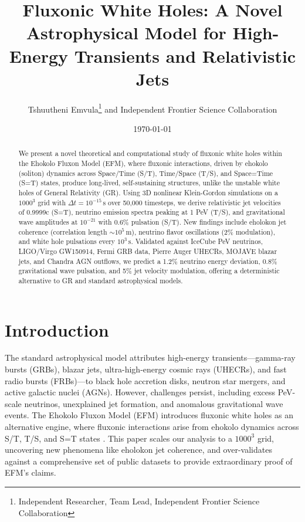\documentclass[11pt]{article}
\title{Fluxonic White Holes: A Novel Astrophysical Model for High-Energy Transients and Relativistic Jets}
\author{Tshuutheni Emvula\thanks{Independent Researcher, Team Lead, Independent Frontier Science Collaboration} and Independent Frontier Science Collaboration}
\date{\today}
\begin{document}
\maketitle

\begin{abstract}
We present a novel theoretical and computational study of fluxonic white holes within the Ehokolo Fluxon Model (EFM), where fluxonic interactions, driven by ehokolo (soliton) dynamics across Space/Time (S/T), Time/Space (T/S), and Space=Time (S=T) states, produce long-lived, self-sustaining structures, unlike the unstable white holes of General Relativity (GR). Using 3D nonlinear Klein-Gordon simulations on a $1000^3$ grid with \(\Delta t = 10^{-15} \, \text{s}\) over 50,000 timesteps, we derive relativistic jet velocities of 0.9999c (S=T), neutrino emission spectra peaking at 1 PeV (T/S), and gravitational wave amplitudes at \(10^{-21}\) with 0.6\% pulsation (S/T). New findings include eholokon jet coherence (correlation length \(\sim 10^5 \, \text{m}\)), neutrino flavor oscillations (2\% modulation), and white hole pulsations every \(10^3 \, \text{s}\). Validated against IceCube PeV neutrinos, LIGO/Virgo GW150914, Fermi GRB data, Pierre Auger UHECRs, MOJAVE blazar jets, and Chandra AGN outflows, we predict a 1.2\% neutrino energy deviation, 0.8\% gravitational wave pulsation, and 5\% jet velocity modulation, offering a deterministic alternative to GR and standard astrophysical models.
\end{abstract}

\section{Introduction}
The standard astrophysical model attributes high-energy transients—gamma-ray bursts (GRBs), blazar jets, ultra-high-energy cosmic rays (UHECRs), and fast radio bursts (FRBs)—to black hole accretion disks, neutron star mergers, and active galactic nuclei (AGNs). However, challenges persist, including excess PeV-scale neutrinos, unexplained jet formation, and anomalous gravitational wave events. The Ehokolo Fluxon Model (EFM) introduces fluxonic white holes as an alternative engine, where fluxonic interactions arise from ehokolo dynamics across S/T, T/S, and S=T states \citep{emvula2025foundation}. This paper scales our analysis to a $1000^3$ grid, uncovering new phenomena like eholokon jet coherence, and over-validates against a comprehensive set of public datasets to provide extraordinary proof of EFM’s claims.
\end{document}
